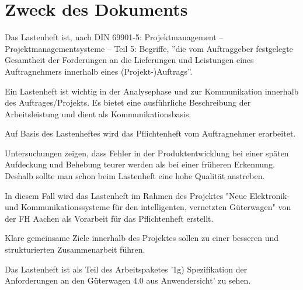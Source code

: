 \section*{Zweck des Dokuments}
Das Lastenheft ist, nach \acrshort{DIN} 69901-5: Projektmanagement – Projektmanagementsysteme – Teil 5: Begriffe, ''die vom Auftraggeber festgelegte Gesamtheit der Forderungen an die Lieferungen und Leistungen eines Auftragnehmers innerhalb eines (Projekt-)Auftrags''\cite{DIN69901-5}.\par
Ein Lastenheft ist wichtig in der Analysephase und zur Kommunikation innerhalb des Auftrages/Projekts. Es bietet eine ausführliche Beschreibung der Arbeitsleistung und dient als Kommunikationsbasis.\par
Auf Basis des Lastenheftes wird das Pflichtenheft vom Auftragnehmer erarbeitet.\par
Untersuchungen zeigen, dass Fehler in der Produktentwicklung bei einer späten Aufdeckung und Behebung teurer werden als bei einer früheren Erkennung. Deshalb sollte man schon beim Lastenheft eine hohe Qualität anstreben.\cite{pmblog}\par
In diesem Fall wird das Lastenheft im Rahmen des Projektes "Neue Elektronik- und Kommunikationssysteme für den intelligenten, vernetzten Güterwagen" von der FH Aachen als Vorarbeit für das Pflichtenheft erstellt. \par
Klare gemeinsame Ziele innerhalb des Projektes sollen zu einer besseren und strukturierten Zusammenarbeit führen.\par
Das Lastenheft ist als Teil des Arbeitspaketes '1g) Spezifikation der Anforderungen an den Güterwagen 4.0 aus Anwendersicht' zu sehen.